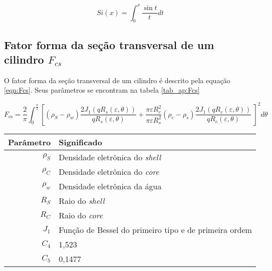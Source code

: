 \begin{apendicesenv}
	\begin{equation}
	Si(x) = \int_0^x \frac{\sin t}{t}dt
	\label{eqn:Si}
	\end{equation}
	
	\subsection{Fator forma da seção transversal de um cilindro $F_{cs}$}
	
	O fator forma da seção transversal de um cilindro é descrito pela equação \ref{eqn:Fcs}. Seus parâmetros se encontram na tabela \ref{tab_ap:Fcs}
	
	\begin{equation}
	F_{\text{cs}} = \frac{2}{\pi}\int_{0}^{\frac{\pi}{2}}%
	\left[ \left(\rho_{S} - \rho_{w} \right) \frac{2J_1 \left( qR_{s}\left( \varepsilon,\theta \right) \right)}{qR_{s}\left( \varepsilon,\theta \right)} %
	+  %
	\frac{\pi\varepsilon R_c^2}{\pi\varepsilon R_s^2}\left( \rho_c - \rho_s \right)	%
	\frac{2J_1\left( qR_{c}\left( \varepsilon,\theta \right) \right)}{qR_{c}\left( \varepsilon,\theta \right)}\  \right]^2 d\theta
	\label{eqn:Fcs}
	\end{equation}
	
    
    \begin{table}
        {\begin{tabular}{r l}
                \toprule
                Parâmetro 			& Significado \\
                \midrule
                $\rho_S$			&  Densidade eletrônica do \emph{shell} \\
                $\rho_C$			&  Densidade eletrônica do \emph{core}  \\
                $\rho_w$			&  Densidade eletrônica da água			\\
                $R_S$			& Raio do \emph{shell} 						\\
                $R_C$			& Raio do \emph{core}						\\
                $J_1$			&  Função de Bessel do primeiro tipo e de primeira ordem\\
                $C_4$			&  1,523	\\
                $C_5$			&  0,1477 	\\						
                \bottomrule
            \end{tabular}}%
        {}%
    \end{table}
    

\end{apendicesenv}
